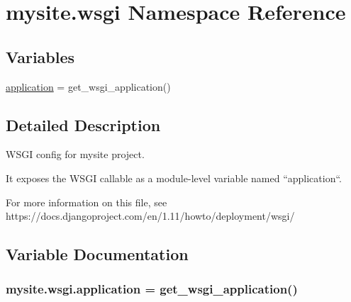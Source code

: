\hypertarget{namespacemysite_1_1wsgi}{}\section{mysite.\+wsgi Namespace Reference}
\label{namespacemysite_1_1wsgi}
\subsection*{Variables}
\begin{DoxyCompactItemize}
\item 
\hyperlink{namespacemysite_1_1wsgi_aff79b59b99c8c1c837e143c516adfc7f}{application} = get\+\_\+wsgi\+\_\+application()
\end{DoxyCompactItemize}


\subsection{Detailed Description}
\begin{DoxyVerb}WSGI config for mysite project.

It exposes the WSGI callable as a module-level variable named ``application``.

For more information on this file, see
https://docs.djangoproject.com/en/1.11/howto/deployment/wsgi/
\end{DoxyVerb}
 

\subsection{Variable Documentation}
\subsubsection[{\texorpdfstring{application}{application}}]{\setlength{\rightskip}{0pt plus 5cm}mysite.\+wsgi.\+application = get\+\_\+wsgi\+\_\+application()}\hypertarget{namespacemysite_1_1wsgi_aff79b59b99c8c1c837e143c516adfc7f}{}\label{namespacemysite_1_1wsgi_aff79b59b99c8c1c837e143c516adfc7f}
